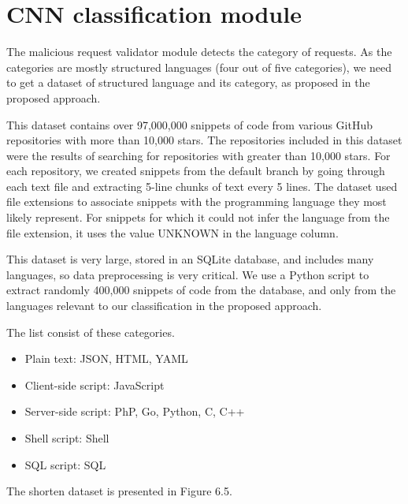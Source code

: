 \newpage
\section{CNN classification module}
\label{sec:CNN_module}
\hspace{0.5cm}The malicious request validator module detects the category of requests. As the categories are mostly structured languages (four out of five categories), we need to get a dataset of structured language and its category, as proposed in the proposed approach.

This dataset contains over 97,000,000 snippets of code from various GitHub repositories with more than 10,000 stars. The repositories included in this dataset were the results of searching for repositories with greater than 10,000 stars. For each repository, we created snippets from the default branch by going through each text file and extracting 5-line chunks of text every 5 lines. The dataset used file extensions to associate snippets with the programming language they most likely represent. For snippets for which it could not infer the language from the file extension, it uses the value UNKNOWN in the language column.

This dataset is very large, stored in an SQLite database, and includes many languages, so data preprocessing is very critical. We use a Python script to extract randomly 400,000 snippets of code from the database, and only from the languages relevant to our classification in the proposed approach.

The list consist of these categories.
\begin{itemize}
	\item Plain text: JSON, HTML, YAML
	\item Client-side script: JavaScript
	\item Server-side script: PhP, Go, Python, C, C++
	\item Shell script: Shell
	\item SQL script: SQL 
\end{itemize}

The shorten dataset is presented in Figure 6.5.

